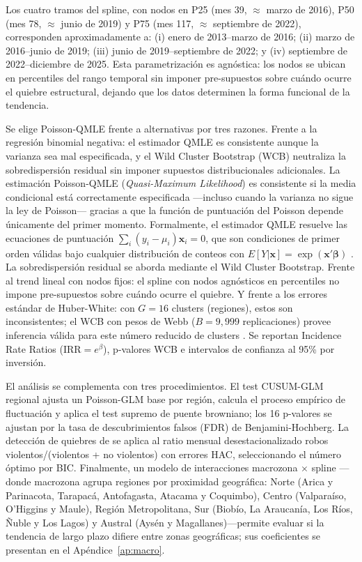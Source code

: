 \documentclass[12pt,a4paper]{article}
\begin{document}
Los cuatro tramos del spline, con nodos en P25 (mes 39, $\approx$ marzo de 2016),
P50 (mes 78, $\approx$ junio de 2019) y P75 (mes 117, $\approx$ septiembre de 2022),
corresponden aproximadamente a: (i) enero de 2013--marzo de 2016; (ii) marzo de
2016--junio de 2019; (iii) junio de 2019--septiembre de 2022; y (iv) septiembre de
2022--diciembre de 2025. Esta parametrizaci\'on es agn\'ostica: los nodos se ubican
en percentiles del rango temporal sin imponer pre-supuestos sobre cu\'ando ocurre el
quiebre estructural, dejando que los datos determinen la forma funcional de la tendencia.

Se elige Poisson-QMLE frente a alternativas por tres razones. Frente a la regresi\'on
binomial negativa: el estimador QMLE es consistente aunque la varianza sea mal
especificada, y el Wild Cluster Bootstrap (WCB) neutraliza la sobredispersi\'on
residual sin imponer supuestos distribucionales adicionales. La estimaci\'on Poisson-QMLE (\textit{Quasi-Maximum Likelihood}) es consistente si la media condicional est\'a correctamente especificada ---incluso cuando la varianza no sigue la ley de Poisson--- gracias a que la funci\'on de puntuaci\'on del Poisson depende \'unicamente del primer momento. Formalmente, el estimador QMLE resuelve las ecuaciones de puntuaci\'on $\sum_{i}(y_i - \mu_i)\mathbf{x}_i = 0$, que son condiciones de primer orden v\'alidas bajo cualquier distribuci\'on de conteos con $E[Y|\mathbf{x}] = \exp(\mathbf{x}'\boldsymbol{\beta})$ \citep{gourieroux1984,wooldridge2010}. La sobredispersi\'on residual se aborda mediante el Wild Cluster Bootstrap. Frente al trend lineal
con nodos fijos: el spline con nodos agn\'osticos en percentiles no impone
pre-supuestos sobre cu\'ando ocurre el quiebre. Y frente a los errores est\'andar de
Huber-White: con $G=16$ clusters (regiones), estos son inconsistentes; el WCB con
pesos de Webb ($B=9{,}999$ replicaciones) provee inferencia v\'alida para este n\'umero
reducido de clusters \citep{cameron2015,mackinnon2023}. Se reportan Incidence Rate
Ratios ($\text{IRR} = e^\beta$), p-valores WCB e intervalos de confianza al 95\% por
inversi\'on.

El an\'alisis se complementa con tres procedimientos. El test CUSUM-GLM regional
ajusta un Poisson-GLM base por regi\'on, calcula el proceso emp\'irico de fluctuaci\'on
\citep{zeileis2002} y aplica el test supremo de puente browniano; los 16 p-valores se
ajustan por la tasa de descubrimientos falsos (FDR) de Benjamini-Hochberg. La
detecci\'on de quiebres de \citet{bai1998} se aplica al ratio mensual desestacionalizado
robos violentos/(violentos + no violentos) con errores HAC, seleccionando el n\'umero
\'optimo por BIC. Finalmente, un modelo de interacciones macrozona $\times$ spline
---donde macrozona agrupa regiones por proximidad geogr\'afica: Norte (Arica y Parinacota, Tarapac\'a, Antofagasta, Atacama y Coquimbo), Centro (Valpara\'iso, O'Higgins y Maule), Regi\'on Metropolitana, Sur (Biob\'io, La Araucan\'ia, Los R\'ios, \~Nuble y Los Lagos) y Austral (Ays\'en y Magallanes)---permite evaluar si la tendencia de largo plazo difiere entre zonas
geogr\'aficas; sus coeficientes se presentan en el Ap\'endice~\ref{ap:macro}.
\end{document}
